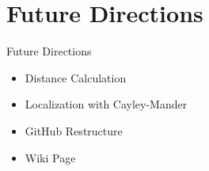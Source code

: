 \documentclass{beamer}
\begin{document}

\section{Future Directions}

\begin{frame}{Future Directions}{}
  \begin{itemize}
      \item Distance Calculation
      \item Localization with Cayley-Mander
      \item GitHub Restructure 
      \item Wiki Page
  \end{itemize}
\end{frame}
\end{document}
